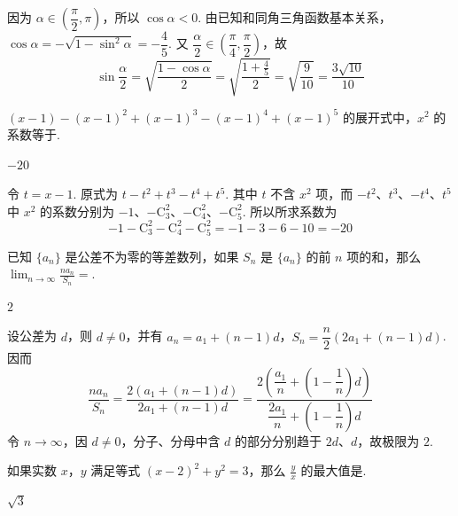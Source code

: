\documentclass[UTF8,a4paper,oneside,11pt]{ctexbook}
\begin{document}
\begin{solution}
因为 \(\alpha\in\left(\dfrac\pi2,\pi\right)\)，所以 \(\cos\alpha<0\). 由已知和同角三角函数基本关系，\(\cos\alpha=-\sqrt{1-\sin^2\alpha}=-\dfrac45\). 又 \(\dfrac\alpha2\in\left(\dfrac\pi4,\dfrac\pi2\right)\)，故
\[
\sin\frac\alpha2=\sqrt{\frac{1-\cos\alpha}{2}}=\sqrt{\frac{1+\frac{4}{5}}{2}}=\sqrt{\frac9{10}}=\frac{3\sqrt{10}}{10}
\]
\end{solution}


\begin{problem}
\((x-1)-(x-1)^2+(x-1)^3-(x-1)^4+(x-1)^5\) 的展开式中，\(x^2\) 的系数等于\fillinblank{}.
\end{problem}

\begin{answer}\(-20\)\end{answer}

\begin{solution}
令 \(t=x-1\). 原式为 \(t-t^2+t^3-t^4+t^5\). 其中 \(t\) 不含 \(x^2\) 项，而 \(-t^2\)、\(t^3\)、\(-t^4\)、\(t^5\) 中 \(x^2\) 的系数分别为 \(-1\)、\(-\mathrm C_3^2\)、\(-\mathrm C_4^2\)、\(-\mathrm C_5^2\). 所以所求系数为
\[
-1-\mathrm C_3^2-\mathrm C_4^2-\mathrm C_5^2=-1-3-6-10=-20
\]
\end{solution}


\begin{problem}
已知 \(\{a_n\}\) 是公差不为零的等差数列，如果 \(S_n\) 是 \(\{a_n\}\) 的前 \(n\) 项的和，那么 \(\displaystyle\lim_{n\to\infty}\frac{na_n}{S_n}=\)\fillinblank{}.
\end{problem}

\begin{answer}\(2\)\end{answer}

\begin{solution}
设公差为 \(d\)，则 \(d\ne0\)，并有 \(a_n=a_1+(n-1)d\)，\(S_n=\dfrac n2\left(2a_1+(n-1)d\right)\). 因而
\[
\frac{na_n}{S_n}=\frac{2\left(a_1+(n-1)d\right)}{2a_1+(n-1)d}=\frac{2\left(\dfrac{a_1}{n}+\left(1-\dfrac1n\right)d\right)}{\dfrac{2a_1}{n}+\left(1-\dfrac1n\right)d}
\]
令 \(n\to\infty\)，因 \(d\ne0\)，分子、分母中含 \(d\) 的部分分别趋于 \(2d\)、\(d\)，故极限为 \(2\).
\end{solution}


\begin{problem}
如果实数 \(x\)，\(y\) 满足等式 \((x-2)^2+y^2=3\)，那么 \(\frac{y}{x}\) 的最大值是\fillinblank{}.
\end{problem}

\begin{answer}\(\sqrt{3}\)\end{answer}
\end{document}
